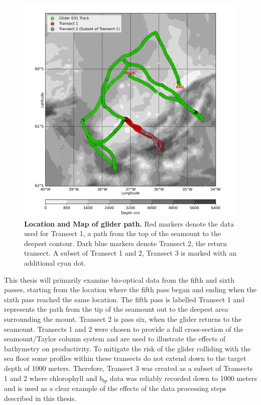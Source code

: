 \documentclass[
	a4paper, %
	10pt, %
	unnumberedsections, %
	twoside, %
]{LTJournalArticle}
\begin{document}
\begin{multicols}{2}
\begin{figure}[H] %
	\includegraphics[width=\linewidth]{Louis/figures/figureN.png}
	\caption{\textbf{Location and  Map of glider path.} Red markers denote the data used for Transect 1, a path from the top of the seamount to the deepest contour.
	Dark blue markers denote Transect 2, the return transect. A subset of Transect 1 and 2, Transect 3 is marked with an
	additional cyan dot.}
	\label{fig:N}
\end{figure}

This thesis will primarily examine bio-optical data from the fifth and sixth passes, starting from the location where the fifth
pass began and ending when the sixth pass reached the same location. The fifth pass is labelled Transect 1 and represents the path
from the tip of the seamount out to the deepest area surrounding the mount. Transect 2 is pass six, when the glider returns to the
seamount. Transects 1 and 2 were chosen to provide a full cross-section of the seamount/Taylor column system and are used to
illustrate the effects of bathymetry on productivity. To mitigate the risk of the glider colliding with the sea floor some profiles
within these transects do not extend down to the target depth of 1000 meters. Therefore, Transect 3 was created as a subset of
Transects 1 and 2 where chlorophyll and $b_{bp}$ data was reliably recorded down to 1000 meters and is used as a clear example of the
effects of the data processing steps described in this thesis.



\end{multicols}
\end{document}
